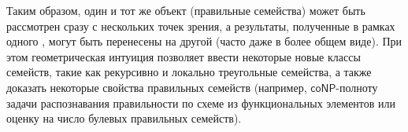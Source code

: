     Таким образом, один и тот же объект (правильные семейства) может быть рассмотрен сразу с нескольких точек зрения, а результаты, полученные в рамках одного , могут быть перенесены на другой  (часто даже в более общем виде).
    При этом геометрическая интуиция позволяет ввести некоторые новые классы семейств, такие как рекурсивно и локально треугольные семейства, а также доказать некоторые свойства правильных семейств (например, $\mathsf{coNP}$-полноту задачи распознавания правильности по схеме из функциональных элементов или оценку на число булевых правильных семейств).
